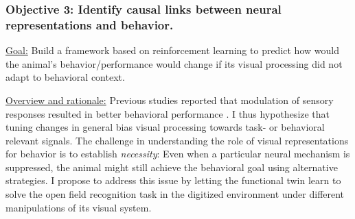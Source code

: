 \documentclass[COG,11pt]{ercgrant}
\begin{document}


\subsubsection{Objective 3: Identify causal links between neural representations and behavior.\hfill{}}
\underline{Goal:} Build a framework based on reinforcement learning to predict how would the animal's behavior/performance would change if its visual processing did not adapt to behavioral context.

\underline{Overview and rationale:} 
Previous studies reported that modulation of sensory responses resulted in better behavioral performance \parencite{Spitzer1988-kq, Bennett2013-rk, Dadarlat2017-jw, De_Gee2022-ir}.
I thus hypothesize that tuning changes in general bias visual processing towards task- or behavioral relevant signals.
The challenge in understanding the role of visual representations for behavior is to establish \textit{necessity}: Even when a particular neural mechanism is suppressed, the animal might still achieve the behavioral goal using alternative strategies. 
I propose to address this issue by letting the functional twin learn to solve the open field recognition task in the digitized environment under different manipulations of its visual system.  

\end{document}
